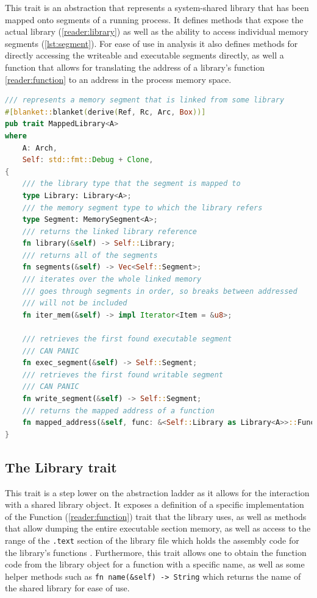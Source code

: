     This trait is an abstraction that represents a system-shared library that has been mapped onto segments of a running process.
    It defines methods that expose the actual library (\autoref{reader:library}) as well as the ability to access individual memory segments (\autoref{lst:segment}).
    For ease of use in analysis it also defines methods for directly accessing the writeable and executable segments directly, as well a function that allows for translating the address of a library's function \autoref{reader:function} to an address in the process memory space.
\begin{lstlisting}[caption=\label{lst:mapped_lib}{The MappedLibrary Trait definition}, language=Rust]
 /// represents a memory segment that is linked from some library
#[blanket::blanket(derive(Ref, Rc, Arc, Box))]
pub trait MappedLibrary<A>
where
    A: Arch,
    Self: std::fmt::Debug + Clone,
{
    /// the library type that the segment is mapped to
    type Library: Library<A>;
    /// the memory segment type to which the library refers
    type Segment: MemorySegment<A>;
    /// returns the linked library reference
    fn library(&self) -> Self::Library;
    /// returns all of the segments
    fn segments(&self) -> Vec<Self::Segment>;
    /// iterates over the whole linked memory
    /// goes through segments in order, so breaks between addressed 
    /// will not be included
    fn iter_mem(&self) -> impl Iterator<Item = &u8>;

    /// retrieves the first found executable segment
    /// CAN PANIC
    fn exec_segment(&self) -> Self::Segment;
    /// retrieves the first found writable segment
    /// CAN PANIC
    fn write_segment(&self) -> Self::Segment;
    /// returns the mapped address of a function
    fn mapped_address(&self, func: &<Self::Library as Library<A>>::Function) -> u64;
}   
\end{lstlisting}
 
    \subsection{The Library trait}
     \label{reader:library} 

    This trait is a step lower on the abstraction ladder as it allows for the interaction with a shared library object.
    It exposes a definition of a specific implementation of the Function (\autoref{reader:function}) trait that the library uses, as well as methods that allow dumping the entire executable section memory, as well as access to the range of the \verb|.text| section of the library file which holds the assembly code for the library's functions \cite{kerrisk_memory_2010}.
    Furthermore, this trait allows one to obtain the function code from the library object for a function with a specific name, as well as some helper methods such as \verb|fn name(&self) -> String| which returns the name of the shared library for ease of use.

